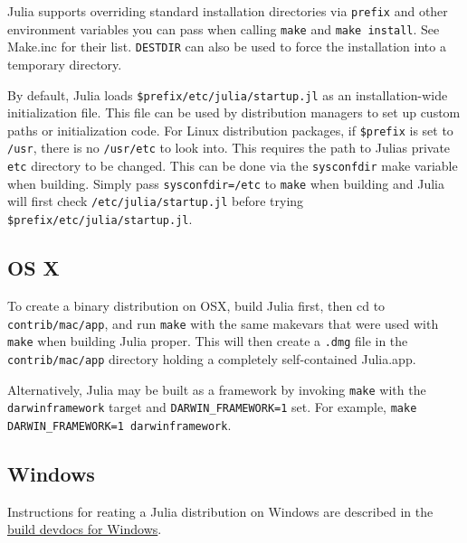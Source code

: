 Julia supports overriding standard installation directories via \texttt{prefix} and other environment variables you can pass when calling \texttt{make} and \texttt{make install}. See Make.inc for their list. \texttt{DESTDIR} can also be used to force the installation into a temporary directory.



By default, Julia loads \texttt{\$prefix/etc/julia/startup.jl} as an installation-wide initialization file. This file can be used by distribution managers to set up custom paths or initialization code. For Linux distribution packages, if \texttt{\$prefix} is set to \texttt{/usr}, there is no \texttt{/usr/etc} to look into. This requires the path to Julia{\textquotesingle}s private \texttt{etc} directory to be changed.  This can be done via the \texttt{sysconfdir} make variable when building.  Simply pass \texttt{sysconfdir=/etc} to \texttt{make} when building and Julia will first check \texttt{/etc/julia/startup.jl} before trying \texttt{\$prefix/etc/julia/startup.jl}.



\hypertarget{1900796573592861142}{}


\subsection{OS X}



To create a binary distribution on OSX, build Julia first, then cd to \texttt{contrib/mac/app}, and run \texttt{make} with the same makevars that were used with \texttt{make} when building Julia proper.  This will then create a \texttt{.dmg} file in the \texttt{contrib/mac/app} directory holding a completely self-contained Julia.app.



Alternatively, Julia may be built as a framework by invoking \texttt{make} with the \texttt{darwinframework} target and \texttt{DARWIN\_FRAMEWORK=1} set.  For example, \texttt{make DARWIN\_FRAMEWORK=1 darwinframework}.



\hypertarget{16271249808016261018}{}


\subsection{Windows}



Instructions for reating a Julia distribution on Windows are described in the \href{https://github.com/JuliaLang/julia/blob/master/doc/src/devdocs/build/windows.md}{build devdocs for Windows}.



